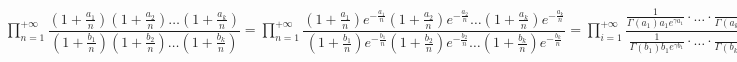 \documentclass[../main.tex]{subfiles}
\begin{document}
        $\prod\limits^{+\infty}_{n = 1} \dfrac{ \left(1 + \frac{a_1}{n} \right) \left(1 + \frac{a_2}{n} \right) \ldots \left(1 + \frac{a_k}{n} \right)}{\left(1 + \frac{b_1}{n} \right) \left(1 + \frac{b_2}{n} \right) \ldots \left( 1 + \frac{b_k}{n} \right)} = \prod\limits^{+\infty}_{n = 1} \dfrac{ \left(1 + \frac{a_1}{n} \right) e^{-\frac{a_1}{n}} \left(1 + \frac{a_2}{n} \right) e^{-\frac{a_2}{n}} \ldots \left(1 + \frac{a_k}{n} \right) e^{-\frac{a_k}{n}}}{\left(1 + \frac{b_1}{n} \right) e^{-\frac{b_1}{n}} \left(1 + \frac{b_2}{n} \right) e^{-\frac{b_2}{n}} \ldots \left( 1 + \frac{b_k}{n} \right) e^{-\frac{b_k}{n}}} = \prod\limits^{+\infty}_{i = 1} \dfrac{\frac{1}{\Gamma (a_1) a_1 e^{\gamma a_1}} \cdot \ldots \cdot \frac{1}{\Gamma (a_k) a_k e^{\gamma a_k}}}{\frac{1}{\Gamma (b_1) b_1 e^{\gamma b_1}} \cdot \ldots \cdot \frac{1}{\Gamma (b_k) b_k e^{\gamma b_k}}} = \prod\limits^{+\infty}_{i = 1} \dfrac{\Gamma (1 + b_1) \ldots \Gamma (1 + b_k)}{\Gamma (1 + a_1) \ldots \Gamma(1 + a_k)}$
        
\newpage

\end{document}
